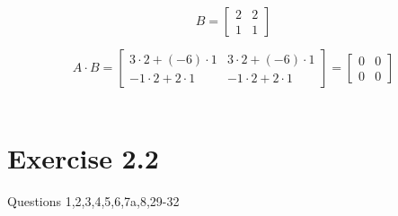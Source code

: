 \documentclass[a4paper]{article}
\begin{document}
\[B = 
\begin{bmatrix}
2&2\\
1&1
\end{bmatrix}
\]

\[A \cdot B =
\begin{bmatrix}
3\cdot2+(-6)\cdot1&3\cdot2+(-6)\cdot1\\
-1\cdot2+2\cdot1&-1\cdot2+2\cdot1
\end{bmatrix} =
\begin{bmatrix}
0&0\\
0&0
\end{bmatrix}
\]\\


\section{Exercise 2.2}
Questions 1,2,3,4,5,6,7a,8,29-32\\
\end{document}
